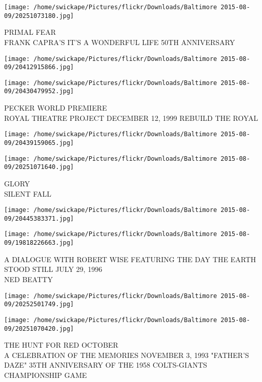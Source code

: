 \documentclass[10pt,letterpaper]{article}
\begin{document}
\vspace{0.25in}
\texttt{[image: /home/swickape/Pictures/flickr/Downloads/Baltimore 2015-08-09/20251073180.jpg]}

PRIMAL FEAR\\
FRANK CAPRA'S IT'S A WONDERFUL LIFE 50TH ANNIVERSARY\\
\pagebreak

\texttt{[image: /home/swickape/Pictures/flickr/Downloads/Baltimore 2015-08-09/20412915866.jpg]}

\vspace{0.25in}
\texttt{[image: /home/swickape/Pictures/flickr/Downloads/Baltimore 2015-08-09/20430479952.jpg]}

PECKER WORLD PREMIERE\\
ROYAL THEATRE PROJECT DECEMBER 12, 1999 REBUILD THE ROYAL\\
\pagebreak

\texttt{[image: /home/swickape/Pictures/flickr/Downloads/Baltimore 2015-08-09/20439159065.jpg]}

\vspace{0.25in}
\texttt{[image: /home/swickape/Pictures/flickr/Downloads/Baltimore 2015-08-09/20251071640.jpg]}

GLORY\\
SILENT FALL\\
\pagebreak

\texttt{[image: /home/swickape/Pictures/flickr/Downloads/Baltimore 2015-08-09/20445383371.jpg]}

\vspace{0.25in}
\texttt{[image: /home/swickape/Pictures/flickr/Downloads/Baltimore 2015-08-09/19818226663.jpg]}

A DIALOGUE WITH ROBERT WISE FEATURING THE DAY THE EARTH STOOD STILL JULY 29, 1996\\
NED BEATTY\\
\pagebreak

\texttt{[image: /home/swickape/Pictures/flickr/Downloads/Baltimore 2015-08-09/20252501749.jpg]}

\vspace{0.25in}
\texttt{[image: /home/swickape/Pictures/flickr/Downloads/Baltimore 2015-08-09/20251070420.jpg]}

THE HUNT FOR RED OCTOBER\\
A CELEBRATION OF THE MEMORIES NOVEMBER 3, 1993 "FATHER'S DAZE" 35TH ANNIVERSARY OF THE 1958 COLTS{-}GIANTS CHAMPIONSHIP GAME\\
\pagebreak
\end{document}
